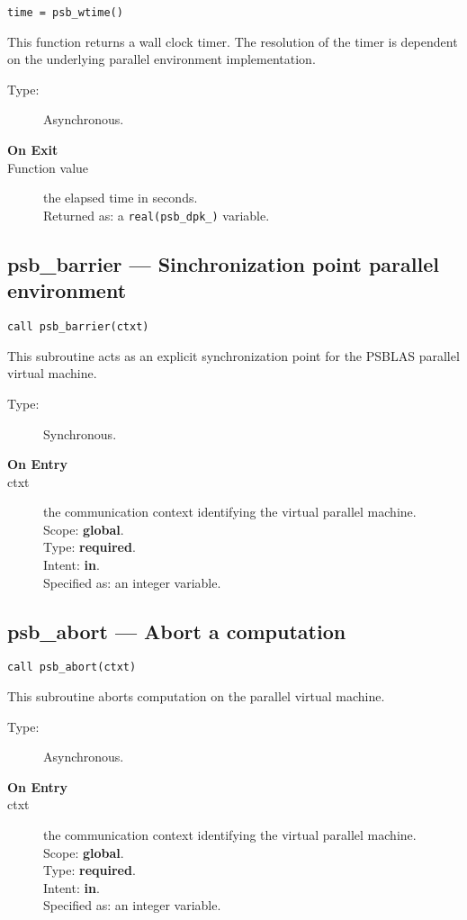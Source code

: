 \begin{verbatim}
time = psb_wtime()
\end{verbatim}

This function returns a wall clock timer. The resolution of the timer
is dependent on the underlying parallel environment implementation.
\begin{description}
\item[Type:] Asynchronous.
\item[\bf  On Exit ]
\item[Function value] the elapsed time in seconds.\\
Returned  as: a  \verb|real(psb_dpk_)|  variable.
\end{description}


\clearpage\subsection{psb\_barrier --- Sinchronization point  parallel
  environment}

\begin{verbatim}
call psb_barrier(ctxt)
\end{verbatim}

This subroutine acts as an explicit synchronization point for  the  PSBLAS
parallel virtual  machine. 
\begin{description}
\item[Type:] Synchronous.
\item[\bf  On Entry ]
\item[ctxt] the communication context identifying the virtual
  parallel machine.\\
Scope: {\bf global}.\\
Type: {\bf required}.\\
Intent: {\bf in}.\\
Specified as: an integer variable.
\end{description}


\clearpage\subsection{psb\_abort --- Abort a computation}

\begin{verbatim}
call psb_abort(ctxt)
\end{verbatim}

This subroutine aborts computation on the parallel virtual machine. 
\begin{description}
\item[Type:] Asynchronous.
\item[\bf  On Entry ]
\item[ctxt] the communication context identifying the virtual
  parallel machine.\\
Scope: {\bf global}.\\
Type: {\bf required}.\\
Intent: {\bf in}.\\
Specified as: an integer variable.
\end{description}





